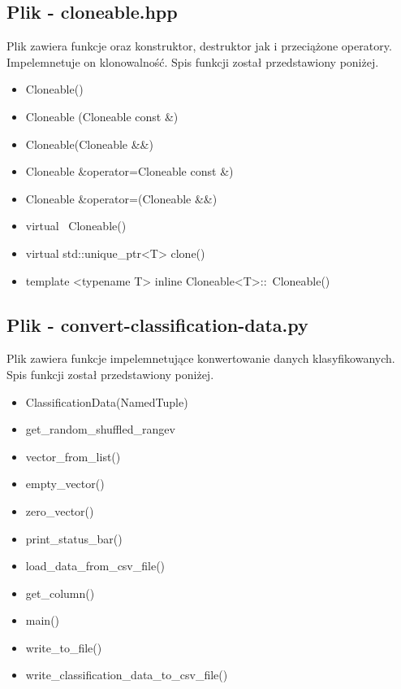 \documentclass{classrep}
\begin{document}
{        \subsection{Plik - cloneable.hpp}
        {
            Plik zawiera funkcje oraz konstruktor, destruktor jak i przeciążone operatory.
            Impelemnetuje on klonowalność.
            Spis funkcji został przedstawiony poniżej.
            \begin{itemize}
                \item Cloneable()
                \item Cloneable (Cloneable const \&)
                \item Cloneable(Cloneable \&\&)
                \item Cloneable \&operator=Cloneable const \&)
                \item Cloneable \&operator=(Cloneable \&\&)
                \item virtual ~Cloneable()
                \item virtual std::unique\_ptr<T> clone()
                \item template <typename T> inline Cloneable<T>::~Cloneable()
            \end{itemize}
        }

        \subsection{Plik - convert-classification-data.py}
        {
            Plik zawiera funkcje impelemnetujące konwertowanie danych klasyfikowanych.
            Spis funkcji został przedstawiony poniżej.
            \begin{itemize}
                \item ClassificationData(NamedTuple)
                \item get\_random\_shuffled\_rangev
                \item vector\_from\_list()
                \item empty\_vector()
                \item zero\_vector()
                \item print\_status\_bar()
                \item load\_data\_from\_csv\_file()
                \item get\_column()
                \item main()
                \item write\_to\_file()
                \item write\_classification\_data\_to\_csv\_file()
            \end{itemize}
        }

}
\end{document}
